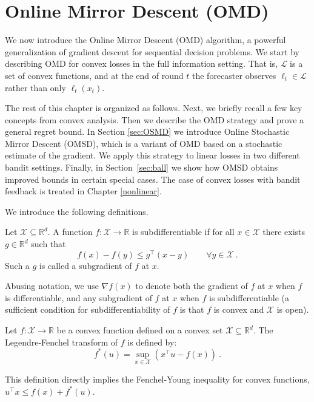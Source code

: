\documentclass[11pt]{hackednow}
\newcommand{\R}{\mathbb{R}}
\newcommand{\cL}{\mathcal{L}}
\newcommand{\cX}{\mathcal{X}}
\begin{document}
\section{Online Mirror Descent (OMD)} \label{sec:OMD}
We now introduce the Online Mirror Descent (OMD) algorithm, a powerful generalization of gradient descent for sequential decision problems. We start by describing OMD for convex losses in the full information setting. That is, $\cL$ is a set of convex functions, and at the end of round $t$ the forecaster observes $\ell_t\in\cL$ rather than only $\ell_t(x_t)$. 

The rest of this chapter is organized as follows. Next, we briefly recall a few key concepts from convex analysis. Then we describe the OMD strategy and prove a general regret bound. In Section \ref{sec:OSMD} we introduce Online Stochastic Mirror Descent (OMSD), which is a variant of OMD based on a stochastic estimate of the gradient. We apply this strategy to linear losses in two different bandit settings. Finally, in Section~\ref{sec:ball} we show how OMSD obtains improved bounds in certain special cases. The case of convex losses with bandit feedback is treated in Chapter \ref{nonlinear}.

We introduce the following definitions.
%
\begin{definition}
Let $\cX\subseteq\R^d$.
A function $f : \cX \to \R$ is subdifferentiable if for all $x \in \cX$ there exists $g \in \R^d$ such that
$$f(x) - f(y) \leq g^{\top} (x-y) \qquad\forall y \in \cX~.$$
Such a $g$ is called a subgradient of $f$ at $x$.
\end{definition}
Abusing notation, we use $\nabla f(x)$ to denote both the gradient of $f$ at $x$ when $f$ is differentiable, and any subgradient of $f$ at $x$ when $f$ is subdifferentiable (a sufficient condition for subdifferentiability of $f$ is that $f$ is convex and $\cX$ is open).
%
\begin{definition}
Let $f : \cX \rightarrow \R$ be a convex function defined on a convex set $\cX\subseteq\R^d$. The Legendre-Fenchel transform of $f$ is defined by:
$$f^*(u) = \sup_{x \in \cX} \left(x^{\top} u - f(x)\right)~.$$
\end{definition}
This definition directly implies the Fenchel-Young inequality for convex functions,
$u^{\top} x \leq f(x) + f^*(u)$.
%
\end{document}
